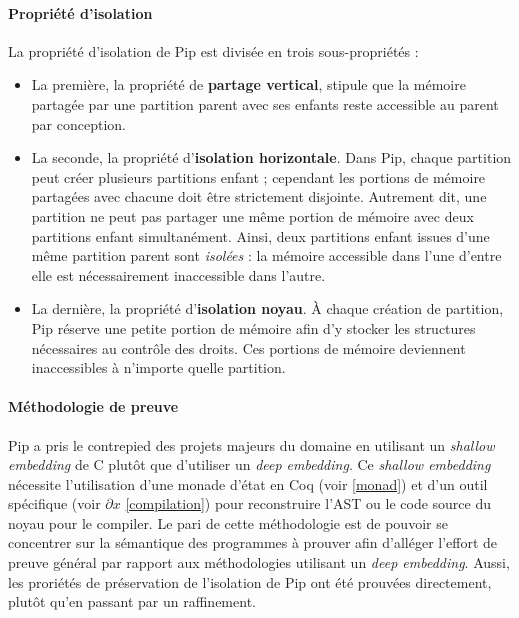 	\begin{figure}[!ht]
		\label{fig:partition_tree}
	\end{figure}

	

	\paragraph{Propriété d'isolation} La propriété d'isolation de Pip est divisée en trois sous-propriétés :
	\begin{itemize}
		\item La première, la propriété de \textbf{partage vertical}, stipule que la mémoire partagée par une partition parent avec ses enfants reste accessible au parent par conception.

		\item La seconde, la propriété d'\textbf{isolation horizontale}. Dans Pip, chaque partition peut créer plusieurs partitions enfant ; cependant les portions de mémoire partagées avec chacune doit être strictement disjointe. Autrement dit, une partition ne peut pas partager une même portion de mémoire avec deux partitions enfant simultanément. Ainsi, deux partitions enfant issues d'une même partition parent sont \emph{isolées} : la mémoire accessible dans l'une d'entre elle est nécessairement inaccessible dans l'autre.

		\item La dernière, la propriété d'\textbf{isolation noyau}. À chaque création de partition, Pip réserve une petite portion de mémoire afin d'y stocker les structures nécessaires au contrôle des droits. Ces portions de mémoire deviennent inaccessibles à n'importe quelle partition.
	\end{itemize}


	\paragraph{Méthodologie de preuve} Pip a pris le contrepied des projets majeurs du domaine en utilisant un \emph{shallow embedding} de C plutôt que d'utiliser un \emph{deep embedding}. Ce \emph{shallow embedding} nécessite l'utilisation d'une monade d'état en Coq (voir \ref{monad}) et d'un outil spécifique (voir $\partial x$ \ref{compilation}) pour reconstruire l'AST ou le code source du noyau pour le compiler.
	Le pari de cette méthodologie est de pouvoir se concentrer sur la sémantique des programmes à prouver afin d'alléger l'effort de preuve général par rapport aux méthodologies utilisant un \emph{deep embedding}. Aussi, les proriétés de préservation de l'isolation de Pip ont été prouvées directement, plutôt qu'en passant par un raffinement.

